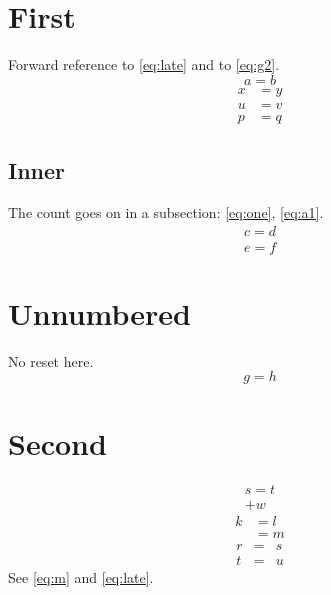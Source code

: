 \documentclass{article}
\numberwithin{equation}{section}
\begin{document}
\section{First}
Forward reference to \eqref{eq:late} and to \eqref{eq:g2}.
\begin{equation}
a = b \label{eq:one}
\end{equation}
\begin{align}
x &= y \label{eq:a1} \\
u &= v \nonumber \\
p &= q
\end{align}
\subsection{Inner}
The count goes on in a subsection: \eqref{eq:one}, \eqref{eq:a1}.
\begin{gather}
c = d \\
e = f \label{eq:g2}
\end{gather}
\section*{Unnumbered}
No reset here.
\begin{equation}
g = h
\end{equation}
\section{Second}
\begin{multline}
s = t \\ + w \label{eq:m}
\end{multline}
\begin{equation}
\begin{split}
k &= l \\ &= m
\end{split} \label{eq:late}
\end{equation}
\begin{eqnarray}
r &=& s \\
t &=& u
\end{eqnarray}
See \eqref{eq:m} and \eqref{eq:late}.
\end{document}
